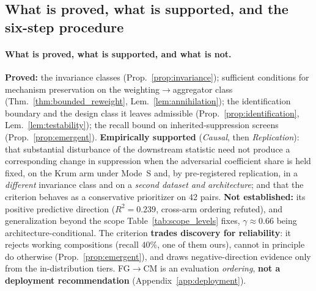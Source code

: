 \documentclass{article}
\begin{document}
\subsection{What is proved, what is supported, and the six-step procedure}
\label{app:conclusion}

\paragraph{What is proved, what is supported, and what is not.} \textbf{Proved:} the invariance classes (Prop.~\ref{prop:invariance}); sufficient conditions for mechanism preservation on the weighting$\to$aggregator class (Thm.~\ref{thm:bounded_reweight}, Lem.~\ref{lem:annihilation}); the identification boundary and the design class it leaves admissible (Prop.~\ref{prop:identification}, Lem.~\ref{lem:testability}); the recall bound on inherited-suppression screens (Prop.~\ref{prop:emergent}). \textbf{Empirically supported} (\emph{Causal}, then \emph{Replication}): that substantial disturbance of the downstream statistic need not produce a corresponding change in suppression when the adversarial coefficient share is held fixed, on the Krum arm under Mode~S and, by pre-registered replication, in a \emph{different} invariance class and on a \emph{second dataset and architecture}; and that the criterion behaves as a conservative prioritizer on 42 pairs. \textbf{Not established:} its positive predictive direction ($R^2{=}0.239$, cross-arm ordering refuted), and generalization beyond the scope Table~\ref{tab:scope_levels} fixes, $\gamma{\approx}0.66$ being architecture-conditional. The criterion \textbf{trades discovery for reliability}: it rejects working compositions (recall $40\%$, one of them ours), cannot in principle do otherwise (Prop.~\ref{prop:emergent}), and draws negative-direction evidence only from the in-distribution tiers. FG$\to$CM is an evaluation \emph{ordering}, \textbf{not a deployment recommendation} (Appendix~\ref{app:deployment}).
\end{document}
